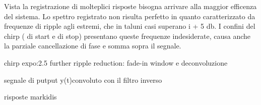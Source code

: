 Vista la registrazione di molteplici risposte bisogna arrivare alla maggior efficenza del sistema.
 Lo spettro registrato non risulta perfetto in quanto caratterizzato da frequenze di ripple agli estremi, che in taluni casi superano i + 5 db. I confini del chirp ( di start e di stop) presentano queste frequenze indesiderate, causa anche la parziale cancellazione di fase e somma sopra il segnale. 


chirp expo:2.5 further ripple reduction: fade-in window  e deconvoluzione

segnale di putput y(t)convoluto con il filtro inverso

risposte markidis



